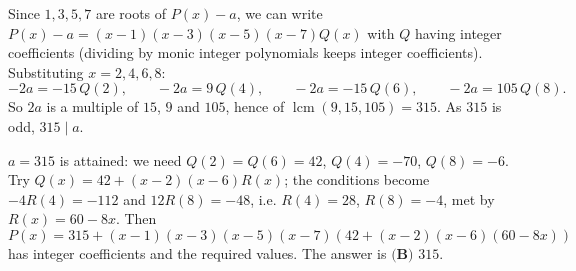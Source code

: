 Since $1,3,5,7$ are roots of $P(x)-a$, we can write $P(x)-a=(x-1)(x-3)(x-5)(x-7)Q(x)$ with $Q$ having integer coefficients (dividing by monic integer polynomials keeps integer coefficients). Substituting $x=2,4,6,8$:
\[-2a=-15\,Q(2),\qquad-2a=9\,Q(4),\qquad-2a=-15\,Q(6),\qquad-2a=105\,Q(8).\]
So $2a$ is a multiple of $15$, $9$ and $105$, hence of $\operatorname{lcm}(9,15,105)=315$. As $315$ is odd, $315\mid a$.

$a=315$ is attained: we need $Q(2)=Q(6)=42$, $Q(4)=-70$, $Q(8)=-6$. Try $Q(x)=42+(x-2)(x-6)R(x)$; the conditions become $-4R(4)=-112$ and $12R(8)=-48$, i.e. $R(4)=28$, $R(8)=-4$, met by $R(x)=60-8x$. Then
\[P(x)=315+(x-1)(x-3)(x-5)(x-7)\left(42+(x-2)(x-6)(60-8x)\right)\]
has integer coefficients and the required values. The answer is $\boxed{\textbf{(B) }315}$.
